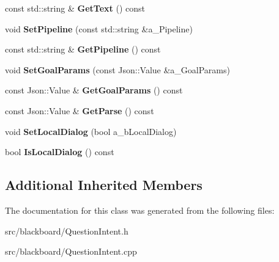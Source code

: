 \begin{DoxyCompactItemize}
\mbox{\label{class_question_intent_a13d4b21e45c34f1e22e005bcca9800c3}} 
const std\+::string \& {\bfseries Get\+Text} () const
\item 
\mbox{\label{class_question_intent_a472c006ec1d401678c68651cff58deda}} 
void {\bfseries Set\+Pipeline} (const std\+::string \&a\+\_\+\+Pipeline)
\item 
\mbox{\label{class_question_intent_a3883830cccf585fa9d1832893821d0cd}} 
const std\+::string \& {\bfseries Get\+Pipeline} () const
\item 
\mbox{\label{class_question_intent_a565f000d1483fcca35052d38dac03f66}} 
void {\bfseries Set\+Goal\+Params} (const Json\+::\+Value \&a\+\_\+\+Goal\+Params)
\item 
\mbox{\label{class_question_intent_acc2cdb413dedb1939962903c1e68adeb}} 
const Json\+::\+Value \& {\bfseries Get\+Goal\+Params} () const
\item 
\mbox{\label{class_question_intent_a927c101af0e10987c6fd2179e2e9f8d8}} 
const Json\+::\+Value \& {\bfseries Get\+Parse} () const
\item 
\mbox{\label{class_question_intent_aff9063bc96ec3f9589a99adab3e3b529}} 
void {\bfseries Set\+Local\+Dialog} (bool a\+\_\+b\+Local\+Dialog)
\item 
\mbox{\label{class_question_intent_a8401cdd87b1f4d9b3ea501c6e7041f75}} 
bool {\bfseries Is\+Local\+Dialog} () const
\end{DoxyCompactItemize}
\subsection*{Additional Inherited Members}


The documentation for this class was generated from the following files\+:\begin{DoxyCompactItemize}
\item 
src/blackboard/Question\+Intent.\+h\item 
src/blackboard/Question\+Intent.\+cpp\end{DoxyCompactItemize}
